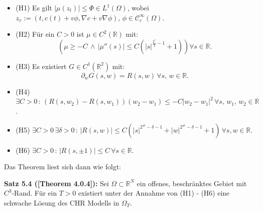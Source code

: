 \begin{itemize}
    \item (H1) Es gilt \(|\mu(z_t)| \leq \Phi \in L^1(\Omega)\), wobei \(z_v := (t,c(t) + v\phi, \nabla c +  v \nabla \phi), \, \phi \in \mathcal{C}_c^{\infty}(\Omega)\).
    \item (H2) Für ein \(C > 0\) ist \(\mu \in C^2(\mathbb{R})\) mit:
    \begin{equation}
        (\mu \geq -C \, \land \, |\mu''(s)| \leq C(|s|^{\frac{2^*}{2}-1} + 1)) \forall s \in \mathbb{R}.
    \end{equation}
    \item (H3) Es existiert \(G \in C^1(\mathbb{R}^2)\) mit:
    \begin{equation}
        \partial_w G(s,w) = R(s,w) \, \forall s, \, w \in \mathbb{R}.
    \end{equation}
    \item (H4) \(\exists C > 0 \, : \, (R(s,w_2) - R(s,w_1))(w_2 - w_1) \leq -C|w_2 - w_1|^2 \, \forall s, \, w_1, \, w_2 \in \mathbb{R}\).
    \item (H5) \(\exists C > 0 \, \exists \delta > 0 \, : \, |R(s,w)| \leq C(|s|^{2^\# - \delta - 1} + |w|^{2^\# - \delta - 1} + 1) \, \forall s,w \in \mathbb{R}\).
    \item (H6) \(\exists C > 0 \, : \, |R(s,\pm 1)| \leq C \, \forall s \in \mathbb{R}\).
\end{itemize}
Das Theorem liest sich dann wie folgt:\\[0.5cm]
\colorbox{generalYellow}{\begin{minipage}{16cm}{\textcolor{black}{}{\label{theo5.4}}}
\textbf{Satz 5.4 (\cite{stinson2021analysis}[Theorem 4.0.4]):} Sei \(\Omega \subset \mathbb{R}^N\) ein offenes, beschränktes Gebiet mit \(C^3\)-Rand. Für ein \(T > 0\) existiert unter der Annahme von (H1) - (H6) eine schwache Lösung des CHR Modells in \(\Omega_T\).
\end{minipage}}

